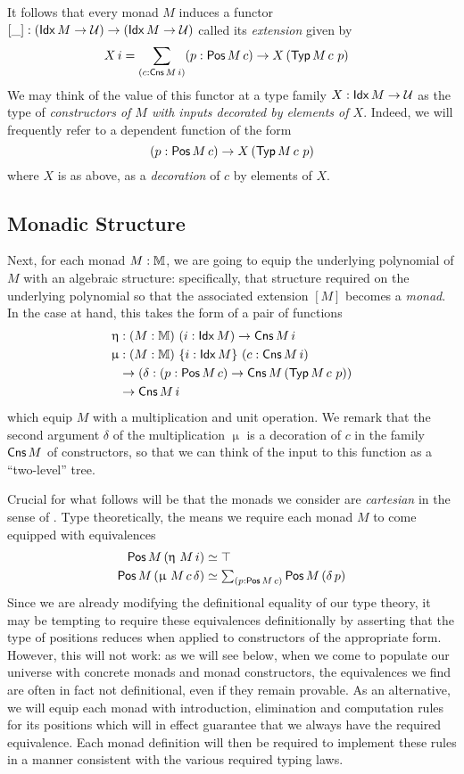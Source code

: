 It follows that every monad $M$ induces a functor
$[\_] : (\mathsf{Idx}\, M \to \mathcal{U}) \to (\mathsf{Idx}\, M \to \mathcal{U})$ called its
\emph{extension} given by
\begin{align*}
  [ M ]\, X\, i &= \sum_{(c : \Cns M\, i)} (p : \Pos M\, c) \to X \, (\Typ M\, c\ p)
\end{align*}
We may think of the value of this functor at a type family
$X : \mathsf{Idx}\, M \to \mathcal{U}$ as the type of \emph{constructors of $M$ with
  inputs decorated by elements of $X$}.  Indeed, we will frequently
refer to a dependent function of the form
\[ (p : \Pos M\, c) \to X \, (\Typ M\, c\ p) \] where $X$ is as above,
as a \emph{decoration} of $c$ by elements of $X$.

\subsection{Monadic Structure}
\label{sec:mnd-struct}

Next, for each monad $M : \mathbb{M}$, we are going to equip the
underlying polynomial of $M$ with an algebraic structure:
specifically, that structure required on the underlying
polynomial so that the associated extension $[ M ]$ becomes
a \emph{monad}.  In the case at hand, this takes the form
of a pair of functions
\begin{align*}
  \upeta &: (M : \MM)\ (i : \Idx M) \to \Cns M\, i\\
  \upmu &: (M : \MM)\ \{i : \Idx M\}\ (c : \Cns M\, i) \\
         &\to (\delta : (p : \Pos M\, c) \to \Cns M\, (\Typ M\, c\ p)) \\
         &\to \Cns M\, i
\end{align*}
which equip $M$ with a multiplication and unit operation.  We remark
that the second argument $\delta$ of the multiplication $\upmu$ is a
decoration of $c$ in the family $\mathsf{Cns}\, M$ of constructors, so that we
can think of the input to this function as a ``two-level'' tree.

Crucial for what follows will be that the monads we consider are
\emph{cartesian} in the sense of \cite{GK}.  Type theoretically, the
means we require each monad $M$ to come equipped with equivalences
\begin{align*}
  \mathsf{Pos}\, M\, (\upeta\ M\, i) &\simeq \top \\
  \mathsf{Pos}\, M\, (\upmu\ M\, c\, \delta) &\simeq \textstyle{\sum_{(p : \mathsf{Pos}\,M\, c)}}\, \mathsf{Pos}\, M\, (\delta\, p)
\end{align*}
Since we are already modifying the definitional equality of our type
theory, it may be tempting to require these equivalences
definitionally by asserting that the type of positions reduces when
applied to constructors of the appropriate form. However, this will
not work: as we will see below, when we come to populate our universe
with concrete monads and monad constructors, the equivalences we find
are often in fact not definitional, even if they remain provable.  As
an alternative, we will equip each monad with introduction,
elimination and computation rules for its positions which will in
effect guarantee that we always have the required equivalence.  Each
monad definition will then be required to implement these rules in a
manner consistent with the various required typing laws.

